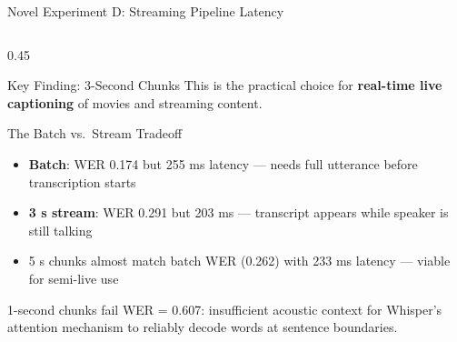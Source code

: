 \documentclass[aspectratio=169]{beamer}
\begin{document}
\begin{frame}{Novel Experiment D: Streaming Pipeline Latency}
\begin{columns}[T]
\begin{column}{0.45\textwidth}
\begin{block}{Key Finding: 3-Second Chunks}
        This is the practical choice for \textbf{real-time live captioning} of movies and streaming content.
      \end{block}
      \begin{block}{The Batch vs.\ Stream Tradeoff}
        \begin{itemize}
          \item \textbf{Batch}: WER 0.174 but 255 ms latency — needs full utterance before transcription starts
          \item \textbf{3 s stream}: WER 0.291 but 203 ms — transcript appears while speaker is still talking
          \item 5 s chunks almost match batch WER (0.262) with 233 ms latency — viable for semi-live use
        \end{itemize}
      \end{block}
      \begin{alertblock}{1-second chunks fail}
        WER = 0.607: insufficient acoustic context for Whisper's attention mechanism to reliably decode words at sentence boundaries.
      \end{alertblock}
    \end{column}
  \end{columns}
\end{frame}

\end{document}
